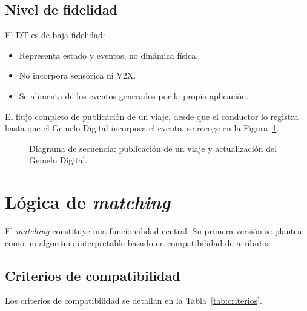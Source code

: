 \subsection{Nivel de fidelidad}

El DT es de baja fidelidad:
\begin{itemize}
    \item Representa estado y eventos, no dinámica física.
    \item No incorpora sensórica ni V2X.
    \item Se alimenta de los eventos generados por la propia aplicación.
\end{itemize}

El flujo completo de publicación de un viaje, desde que el conductor lo registra hasta que el Gemelo Digital incorpora el evento, se recoge en la Figura~\ref{fig:secuencia-publicar}.

\begin{figure}[H]
  \centering
  
  \caption{Diagrama de secuencia: publicación de un viaje y actualización del Gemelo Digital.}
  \label{fig:secuencia-publicar}
\end{figure}

\section{Lógica de \textit{matching}}

El \textit{matching} constituye una funcionalidad central. Su primera versión se plantea como un algoritmo interpretable basado en compatibilidad de atributos.

\subsection{Criterios de compatibilidad}

Los criterios de compatibilidad se detallan en la Tabla~\ref{tab:criterios}.

